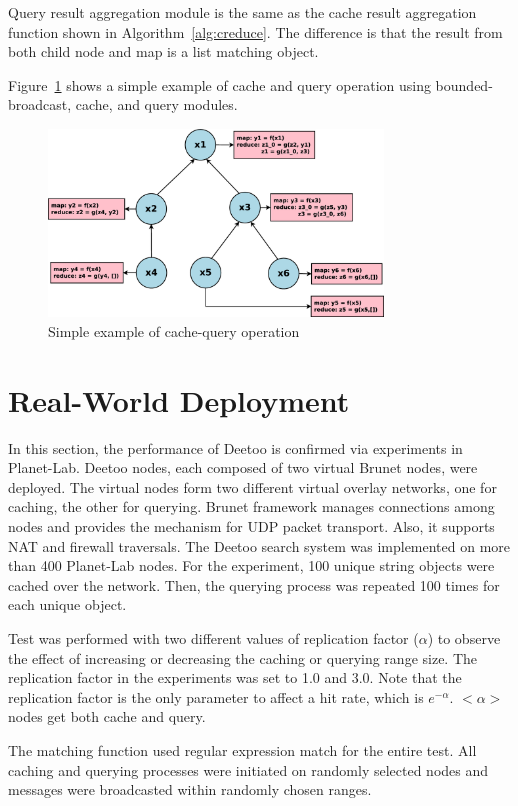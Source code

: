\documentclass[9.5pt,journal,final,finalsubmission,twocolumn]{IEEEtran}
\begin{document}
Query result aggregation module is the same as the cache result aggregation function shown in Algorithm~\ref{alg:creduce}. 
The difference is that the result from both child node and map is a list matching object. 

Figure~\ref{fig:mapreduce_tree} shows a simple example of cache and query operation using bounded-broadcast, cache, and query modules.

\begin{figure}
\centering
\includegraphics[width=3.5in]{mapreduce_tree.eps}
\caption{Simple example of cache-query operation}\label{fig:mapreduce_tree}
\end{figure}

\fi

\section{Real-World Deployment}\label{sec:test}
In this section, the performance of Deetoo is confirmed via experiments 
in Planet-Lab.
Deetoo nodes, each composed of two virtual Brunet nodes,
were deployed.
The virtual nodes form two 
different virtual overlay networks, one for caching, the other for 
querying.
Brunet framework manages connections among nodes and provides the mechanism 
for UDP packet transport. Also, it supports NAT and firewall traversals.
The Deetoo search system was implemented on more than 400 Planet-Lab nodes. 
For the experiment, 100 unique string objects were cached over 
the network. Then, 
the querying process was repeated 100 times for each unique object. 

Test was performed with two different values of replication factor 
($\alpha$) to observe the effect of increasing or decreasing the caching or 
querying range size. 
The replication factor in the experiments was set to 1.0 and 3.0.
Note that the replication factor is the only parameter to affect 
a hit rate, which is $e^{-\alpha}$. $<\alpha>$ nodes get both cache and 
query.

The matching function used regular expression match for the entire
test.
All caching and querying processes were initiated on randomly selected nodes
and messages were broadcasted within randomly chosen ranges. 
\end{document}
